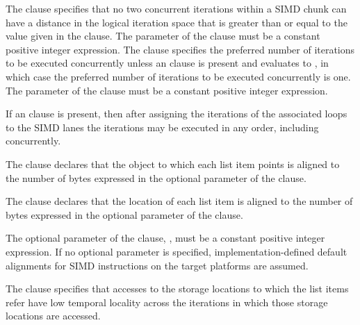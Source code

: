 The  clause specifies that no two concurrent iterations within a SIMD chunk can have a distance in the logical iteration space that is greater than or equal to the value given in the clause.
The parameter of the  clause must be a constant positive integer expression.
The  clause specifies the preferred number of iterations to be executed concurrently unless an  clause is present and evaluates to , in which case the preferred number of iterations to be executed concurrently is one.
The parameter of the  clause must be a constant positive integer expression.

If an  clause is present, then after assigning the iterations
of the associated loops to the SIMD lanes the iterations may be executed in any order,
including concurrently.


\begin{ccppspecific}
The  clause declares that the object to which each list item points is aligned to
the number of bytes expressed in the optional parameter of the  clause.
\end{ccppspecific}

\begin{fortranspecific}

The  clause declares that the location of each list item
is aligned to the number of bytes expressed in the optional parameter
of the  clause.

\end{fortranspecific}

The optional parameter of the  clause, , must be a constant positive
integer expression. If no optional parameter is specified, implementation-defined default
alignments for SIMD instructions on the target platforms are assumed.

The  clause specifies that accesses to the storage locations to which the list items refer have low temporal locality across the iterations in which those storage locations are accessed.

